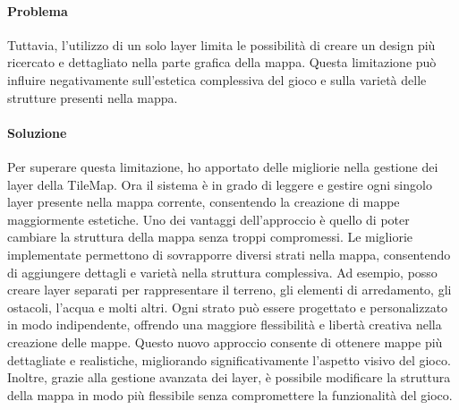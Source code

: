 \documentclass[a4paper,12pt]{report}
\begin{document}
\paragraph*{Problema}
Tuttavia, l'utilizzo di un solo layer limita le possibilità di creare un design più ricercato e dettagliato nella parte grafica della mappa. 
Questa limitazione può influire negativamente sull'estetica complessiva del gioco e sulla varietà delle strutture presenti nella mappa.
\paragraph*{Soluzione}
Per superare questa limitazione, ho apportato delle migliorie nella gestione dei layer della TileMap.
Ora il sistema è in grado di leggere e gestire ogni singolo layer presente nella mappa corrente, consentendo la creazione di mappe maggiormente estetiche.
Uno dei vantaggi dell'approccio è quello di poter cambiare la struttura della mappa senza troppi compromessi.
Le migliorie implementate permettono di sovrapporre diversi strati nella mappa, consentendo di aggiungere dettagli e varietà nella struttura complessiva. 
Ad esempio, posso creare layer separati per rappresentare il terreno, gli elementi di arredamento, gli ostacoli, l'acqua e molti altri. 
Ogni strato può essere progettato e personalizzato in modo indipendente, offrendo una maggiore flessibilità e libertà creativa nella creazione delle mappe.
Questo nuovo approccio consente di ottenere mappe più dettagliate e realistiche, migliorando significativamente l'aspetto visivo del gioco. 
Inoltre, grazie alla gestione avanzata dei layer, è possibile modificare la struttura della mappa in modo più flessibile senza compromettere la funzionalità del gioco.
\end{document}
